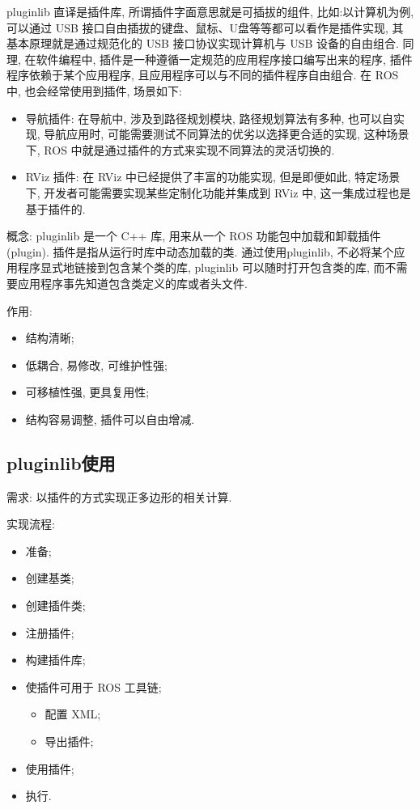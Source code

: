 \documentclass[openany, fontset=windowsold]{ctexbook}
\theoremstyle{kaiti}
\theoremstyle{normal}
\begin{document}
pluginlib 直译是插件库, 所谓插件字面意思就是可插拔的组件, 比如:以计算机为例, 可以通过 USB 接口自由插拔的键盘、鼠标、U盘等等都可以看作是插件实现, 其基本原理就是通过规范化的 USB 接口协议实现计算机与 USB 设备的自由组合. 同理, 在软件编程中, 插件是一种遵循一定规范的应用程序接口编写出来的程序, 插件程序依赖于某个应用程序, 且应用程序可以与不同的插件程序自由组合. 在 ROS 中, 也会经常使用到插件, 场景如下:

\begin{itemize}
  \item 导航插件: 在导航中, 涉及到路径规划模块, 路径规划算法有多种, 也可以自实现, 导航应用时, 可能需要测试不同算法的优劣以选择更合适的实现, 这种场景下, ROS 中就是通过插件的方式来实现不同算法的灵活切换的.

  \item RViz 插件: 在 RViz 中已经提供了丰富的功能实现, 但是即便如此, 特定场景下, 开发者可能需要实现某些定制化功能并集成到 RViz 中, 这一集成过程也是基于插件的.
\end{itemize}

概念: pluginlib 是一个 C++ 库, 用来从一个 ROS 功能包中加载和卸载插件 (plugin). 插件是指从运行时库中动态加载的类. 通过使用pluginlib, 不必将某个应用程序显式地链接到包含某个类的库,  pluginlib 可以随时打开包含类的库, 而不需要应用程序事先知道包含类定义的库或者头文件.

作用:

\begin{itemize}
  \item 结构清晰; 
  \item 低耦合, 易修改, 可维护性强; 
  \item 可移植性强, 更具复用性; 
  \item 结构容易调整, 插件可以自由增减.
\end{itemize}

\subsection{pluginlib使用}

需求: 以插件的方式实现正多边形的相关计算.

实现流程:

\begin{itemize}
  \item 准备; 
  \item 创建基类; 
  \item 创建插件类; 
  \item 注册插件;
  \item 构建插件库;
  \item 使插件可用于 ROS 工具链;
  \begin{itemize}
    \item 配置 XML;
    \item 导出插件;
  \end{itemize}
  \item 使用插件;
  \item 执行.
\end{itemize}
\end{document}
